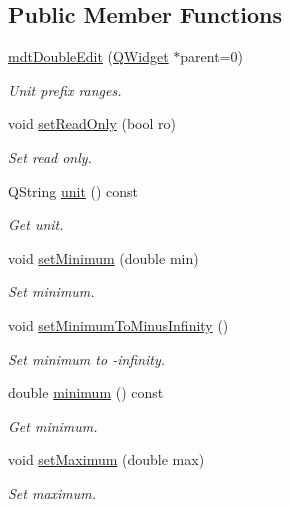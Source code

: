 \subsection*{Public Member Functions}
\begin{DoxyCompactItemize}
\item 
\hyperlink{classmdt_double_edit_a4b6a416aeb8594ad45fb706e79250ba7}{mdt\-Double\-Edit} (\hyperlink{class_q_widget}{Q\-Widget} $\ast$parent=0)
\begin{DoxyCompactList}\small\item\em Unit prefix ranges. \end{DoxyCompactList}\item 
void \hyperlink{classmdt_double_edit_a5542c60073e80cfc5cc2f9f40167b460}{set\-Read\-Only} (bool ro)
\begin{DoxyCompactList}\small\item\em Set read only. \end{DoxyCompactList}\item 
Q\-String \hyperlink{classmdt_double_edit_ad425b7f96ae6906175c7a70fa3b8b017}{unit} () const 
\begin{DoxyCompactList}\small\item\em Get unit. \end{DoxyCompactList}\item 
void \hyperlink{classmdt_double_edit_abc719b2ad6c106759f4d138b7b221a75}{set\-Minimum} (double min)
\begin{DoxyCompactList}\small\item\em Set minimum. \end{DoxyCompactList}\item 
void \hyperlink{classmdt_double_edit_ae6dbdee92d4704a1e2185fb56653e913}{set\-Minimum\-To\-Minus\-Infinity} ()
\begin{DoxyCompactList}\small\item\em Set minimum to -\/infinity. \end{DoxyCompactList}\item 
double \hyperlink{classmdt_double_edit_a2e0974378639708551a703b5b1dc3969}{minimum} () const 
\begin{DoxyCompactList}\small\item\em Get minimum. \end{DoxyCompactList}\item 
void \hyperlink{classmdt_double_edit_a3b238d597fcf13bfd6b875ec228435e7}{set\-Maximum} (double max)
\begin{DoxyCompactList}\small\item\em Set maximum. \end{DoxyCompactList}\item 

\end{DoxyCompactItemize}
